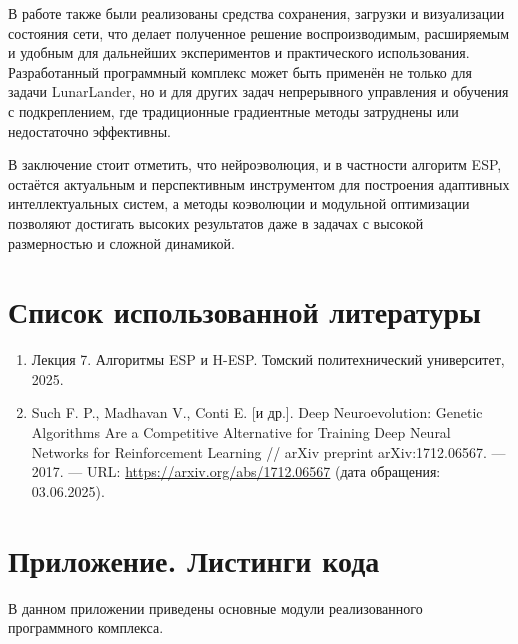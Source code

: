 \documentclass[a4paper,12pt]{article}
\begin{document}
В работе также были реализованы средства сохранения, загрузки и визуализации состояния сети, что делает полученное решение воспроизводимым, расширяемым и удобным для дальнейших экспериментов и практического использования. Разработанный программный комплекс может быть применён не только для задачи LunarLander, но и для других задач непрерывного управления и обучения с подкреплением, где традиционные градиентные методы затруднены или недостаточно эффективны.

В заключение стоит отметить, что нейроэволюция, и в частности алгоритм ESP, остаётся актуальным и перспективным инструментом для построения адаптивных интеллектуальных систем, а методы коэволюции и модульной оптимизации позволяют достигать высоких результатов даже в задачах с высокой размерностью и сложной динамикой.

\section*{Список использованной литературы}
\begin{enumerate}
    \item Лекция 7. Алгоритмы ESP и H-ESP. Томский политехнический университет, 2025.
    \item Such F. P., Madhavan V., Conti E. [и др.]. Deep Neuroevolution: Genetic Algorithms Are a Competitive Alternative for Training Deep Neural Networks for Reinforcement Learning // arXiv preprint arXiv:1712.06567. — 2017. — URL: \url{https://arxiv.org/abs/1712.06567} (дата обращения: 03.06.2025). 
\end{enumerate}

\newpage
\section*{Приложение. Листинги кода}

В данном приложении приведены основные модули реализованного программного комплекса.
\end{document}
